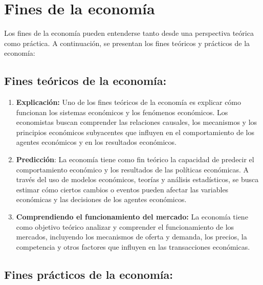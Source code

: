 \documentclass[
  jou,
  floatsintext,
  longtable,
  a4paper,
  nolmodern,
  notxfonts,
  notimes,
  12pt,
  colorlinks=true,linkcolor=blue,citecolor=blue,urlcolor=blue]{apa7}
\begin{document}
\section{Fines de la economía}\label{fines-de-la-economuxeda}

Los fines de la economía pueden entenderse tanto desde una perspectiva
teórica como práctica. A continuación, se presentan los fines teóricos y
prácticos de la economía:

\subsection{Fines teóricos de la
economía:}\label{fines-teuxf3ricos-de-la-economuxeda}

\begin{enumerate}
\def\labelenumi{\arabic{enumi}.}
\item
  \textbf{Explicación:} Uno de los fines teóricos de la economía es
  explicar cómo funcionan los sistemas económicos y los fenómenos
  económicos. Los economistas buscan comprender las relaciones causales,
  los mecanismos y los principios económicos subyacentes que influyen en
  el comportamiento de los agentes económicos y en los resultados
  económicos.
\item
  \textbf{Predicción}: La economía tiene como fin teórico la capacidad
  de predecir el comportamiento económico y los resultados de las
  políticas económicas. A través del uso de modelos económicos, teorías
  y análisis estadísticos, se busca estimar cómo ciertos cambios o
  eventos pueden afectar las variables económicas y las decisiones de
  los agentes económicos.
\item
  \textbf{Comprendiendo el funcionamiento del mercado:} La economía
  tiene como objetivo teórico analizar y comprender el funcionamiento de
  los mercados, incluyendo los mecanismos de oferta y demanda, los
  precios, la competencia y otros factores que influyen en las
  transacciones económicas.
\end{enumerate}

\subsection{Fines prácticos de la
economía:}\label{fines-pruxe1cticos-de-la-economuxeda}
\end{document}

